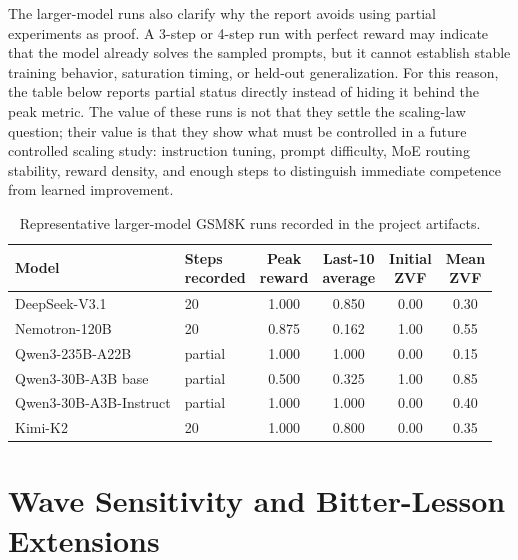 \documentclass[12pt,a4paper]{report}
\begin{document}
The larger-model runs also clarify why the report avoids using partial experiments as proof. A 3-step or 4-step run with perfect reward may indicate that the model already solves the sampled prompts, but it cannot establish stable training behavior, saturation timing, or held-out generalization. For this reason, the table below reports partial status directly instead of hiding it behind the peak metric. The value of these runs is not that they settle the scaling-law question; their value is that they show what must be controlled in a future controlled scaling study: instruction tuning, prompt difficulty, MoE routing stability, reward density, and enough steps to distinguish immediate competence from learned improvement.

\begin{table}[ht]
\centering
\caption{Representative larger-model GSM8K runs recorded in the project artifacts.}
\label{tab:frontier-runs}
\small
\setlength{\tabcolsep}{3pt}
\begin{tabular}{@{}p{}p{}cccc@{}}
\toprule
Model & \shortstack{Steps\\recorded} & \shortstack{Peak\\reward} & \shortstack{Last-10\\average} & \shortstack{Initial\\ZVF} & \shortstack{Mean\\ZVF}\\
\midrule
DeepSeek-V3.1 & 20 & 1.000 & 0.850 & 0.00 & 0.30\\
Nemotron-120B & 20 & 0.875 & 0.162 & 1.00 & 0.55\\
Qwen3-235B-A22B & partial & 1.000 & 1.000 & 0.00 & 0.15\\
Qwen3-30B-A3B base & partial & 0.500 & 0.325 & 1.00 & 0.85\\
Qwen3-30B-A3B-Instruct & partial & 1.000 & 1.000 & 0.00 & 0.40\\
Kimi-K2 & 20 & 1.000 & 0.800 & 0.00 & 0.35\\
\bottomrule
\end{tabular}
\end{table}

\section{Wave Sensitivity and Bitter-Lesson Extensions}
\label{sec:wave-bitter-lesson}
\end{document}

